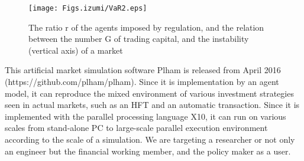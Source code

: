 \begin{figure}[htb]
  \centering
  \texttt{[image: Figs.izumi/VaR2.eps]}
  \caption{The ratio r of the agents imposed by regulation, and the relation between the number G of trading capital, and the instability (vertical axis) of a market}
  \label{fig:Figs.izumi/var2.eps}
\end{figure}


This artificial market simulation software Plham is released from
April 2016 (https://github.com/plham/plham).  Since it is
implementation by an agent model, it can reproduce the mixed
environment of various investment strategies seen in actual markets,
such as an HFT and an automatic transaction.  Since it is implemented
with the parallel processing language X10, it can run on various
scales from stand-alone PC to large-scale parallel execution
environment according to the scale of a simulation.  We are targeting
a researcher or not only an engineer but the financial working member,
and the policy maker as a user.

%




